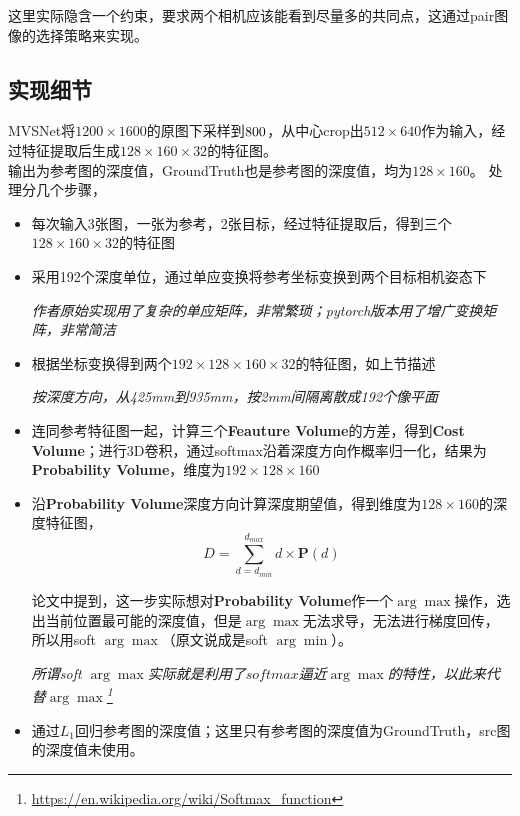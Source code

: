 		这里实际隐含一个约束，要求两个相机应该能看到尽量多的共同点，这通过pair图像的选择策略来实现。

\subsection{实现细节}
	MVSNet将$1200 \times 1600$的原图下采样到$800 \time 600$，从中心crop出$512 \times 640$作为输入，经过特征提取后生成$128 \times 160 \times 32$的特征图。\\

	输出为参考图的深度值，GroundTruth也是参考图的深度值，均为$128 \times 160$。 处理分几个步骤，

	\begin{itemize}
		\item 每次输入3张图，一张为参考，2张目标，经过特征提取后，得到三个$128 \times 160 \times 32$的特征图
		
		\item 采用192个深度单位，通过单应变换将参考坐标变换到两个目标相机姿态下

			\textit{作者原始实现用了复杂的单应矩阵，非常繁琐；pytorch版本用了增广变换矩阵，非常简洁}

		\item 根据坐标变换得到两个$192 \times 128 \times 160 \times 32$的特征图，如上节描述

			\textit{按深度方向，从425mm到935mm，按2mm间隔离散成192个像平面}

		\item 连同参考特征图一起，计算三个\textbf{Feauture Volume}的方差，得到\textbf{Cost Volume}；进行3D卷积，通过softmax沿着深度方向作概率归一化，结果为\textbf{Probability Volume}，维度为$192 \times 128 \times 160$

		\item 沿\textbf{Probability Volume}深度方向计算深度期望值，得到维度为$128 \times 160$的深度特征图，
			$$
				D = \sum_{d = d_{min}}^{d_{max}} d \times \mathbf{P}(d)
			$$

			论文中提到，这一步实际想对\textbf{Probability Volume}作一个$\arg\max$操作，选出当前位置最可能的深度值，但是$\arg\max$无法求导，无法进行梯度回传，所以用soft $\arg\max$（原文说成是soft $\arg\min$）。

			\textit{所谓soft $\arg\max$实际就是利用了$softmax$逼近$\arg\max$的特性，以此来代替$\arg\max$\footnote{\url{https://en.wikipedia.org/wiki/Softmax_function}}}

		\item 通过$L_1$回归参考图的深度值；这里只有参考图的深度值为GroundTruth，src图的深度值未使用。
	\end{itemize}

